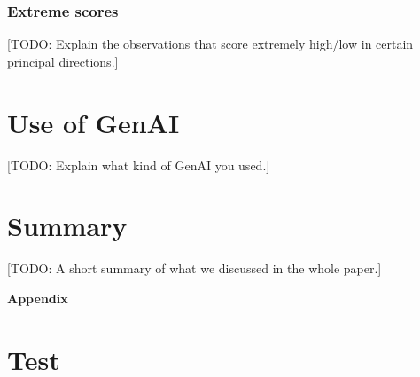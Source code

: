 \documentclass[dtu]{dtuarticle}
\newcommand{\todo}[1]{\color{red}[TODO: #1]\color{black}}
\begin{document}
	\subsubsection{Extreme scores}

	\todo{Explain the observations that score extremely high/low in certain principal directions.}

	\section{Use of GenAI}

	\todo{Explain what kind of GenAI you used.}

	\section*{Summary}

	\todo{A short summary of what we discussed in the whole paper.}

	
	

	\newpage

	\appendix

	\LARGE\bfseries Appendix

	\section{Test}
\end{document}
